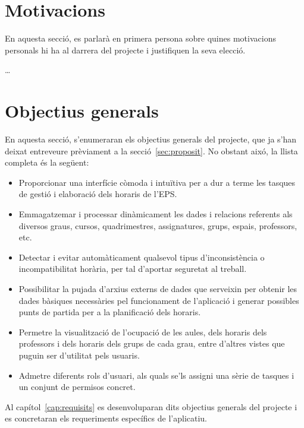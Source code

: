 \documentclass[a4paper,12pt]{ThesisStyle}
\begin{document}
\section{Motivacions}
\label{sec:motivacions}

En aquesta secció, es parlarà en primera persona sobre quines motivacions personals hi ha al darrera del projecte i justifiquen la seva elecció.

\ldots

\section{Objectius generals}
\label{sec:objectius_generals}

En aquesta secció, s'enumeraran els objectius generals del projecte, que ja s'han deixat entreveure prèviament a la secció~\ref{sec:proposit}. No obstant aixó,
la llista completa és la següent:
\begin{itemize}
  \item Proporcionar una interfície còmoda i intuïtiva per a dur a terme les tasques de gestió i elaboració dels horaris de l'EPS.
  \item Emmagatzemar i processar dinàmicament les dades i relacions referents als diversos graus, cursos, quadrimestres, assignatures, grups, espais, professors, etc.
  \item Detectar i evitar automàticament qualsevol tipus d'inconsistència o incompatibilitat horària, per tal d'aportar seguretat al treball.
  \item Possibilitar la pujada d'arxius externs de dades que serveixin per obtenir les dades bàsiques necessàries pel funcionament de l'aplicació i generar possibles
  punts de partida per a la planificació dels horaris.
  \item Permetre la visualització de l'ocupació de les aules, dels horaris dels professors i dels horaris dels grups de cada grau, entre d'altres vistes que puguin ser
  d'utilitat pels usuaris.
  \item Admetre diferents rols d'usuari, als quals se'ls assigni una sèrie de tasques i un conjunt de permisos concret.
\end{itemize}

Al capítol~\ref{cap:requisits} es desenvoluparan dits objectius generals del projecte i es concretaran els requeriments específics de l'aplicatiu.


\end{document}
